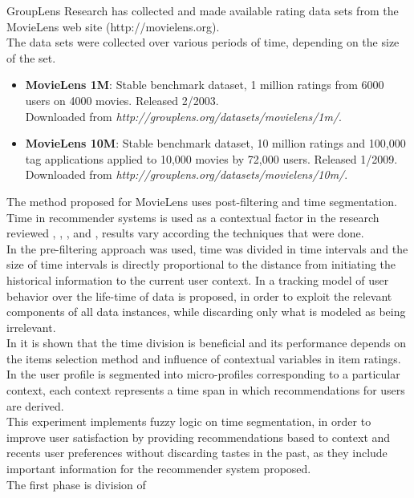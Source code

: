 GroupLens Research has collected and made available rating data sets
from the MovieLens  web site (http://movielens.org). \\   The data sets
were collected over various periods of time,  depending on the size of
the set.
\begin{itemize} 
\item \textbf{MovieLens 1M}: Stable benchmark dataset, 
1 million ratings from 6000 users on 4000 movies.
Released 2/2003.\\ Downloaded from
\textit{http://grouplens.org/datasets/movielens/1m/}. 
\item \textbf{MovieLens 10M}: Stable benchmark dataset, 
10 million ratings and 100,000
tag applications applied to 10,000 movies by 72,000 users. 
Released 1/2009. \\Downloaded from
\textit{http://grouplens.org/datasets/movielens/10m/}. 
\end{itemize}
The method proposed for MovieLens uses post-filtering 
and time segmentation.
Time in recommender systems is used  as a contextual factor in the
research reviewed \cite{baltrunas2009context},
\cite{baltrunas2009towards}, \cite{koren2010collaborative}, and
\cite{he2009time}, results vary according the techniques that were
done.\\  In \cite{he2009time} the pre-filtering approach was used, time
was divided in time intervals and the size of time intervals is
directly proportional to the distance from initiating the historical
information to the current user context. In
\cite{koren2010collaborative} a tracking model of user behavior over
the life-time of data is proposed, in order to exploit the relevant
components of all  data instances, while discarding only what is
modeled as being irrelevant.\\  In \cite{baltrunas2009context} it is
shown that the time division is beneficial and its performance depends
on the items selection method and influence of contextual variables in
item ratings. In \cite{baltrunas2009towards} the user profile is
segmented into micro-profiles corresponding to a particular context,
each context represents a time span in which recommendations for users
are derived.\\  This experiment implements fuzzy logic on time
segmentation, in order to improve user satisfaction by providing
recommendations based to context and recents user preferences without
discarding tastes in the past, as they include important information
for the recommender system proposed. \\ The first phase is division of
